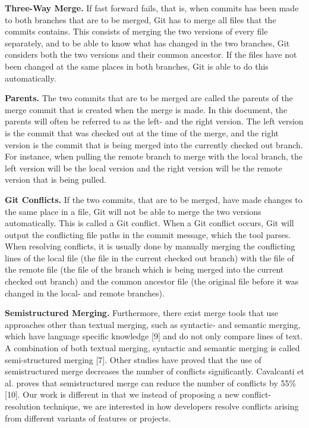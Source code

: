 \textbf{Three-Way Merge.} If fast forward fails, that is, when commits has been made to both branches that are to be merged, Git has to merge all files that the commits contains. This consists of merging the two versions of every file separately, and to be able to know what has changed in the two branches, Git considers both the two versions and their common ancestor. If the files have not been changed at the same places in both branches, Git is able to do this automatically.

\textbf{Parents.} The two commits that are to be merged are called the parents of the merge commit that is created when the merge is made. In this document, the parents will often be referred to as the left- and the right version. The left version is the commit that was checked out at the time of the merge, and the right version is the commit that is being merged into the currently checked out branch. For instance, when pulling the remote branch to merge with the local branch, the left version will be the local version and the right version will be the remote version that is being pulled.

\textbf{Git Conflicts.} If the two commits, that are to be merged, have made changes to the same place in a file, Git will not be able to merge the two versions automatically. This is called a Git conflict. When a Git conflict occurs, Git will output the conflicting file paths in the commit message, which the tool parses. When resolving conflicts, it is usually done by manually merging the conflicting lines of the local file (the file in the current checked out branch) with the file of the remote file (the file of the branch which is being merged into the current checked out branch) and the common ancestor file (the original file before it was changed in the local- and remote branches).

\textbf{Semistructured Merging.} Furthermore, there exist merge tools that use approaches other than textual merging, such as syntactic- and semantic merging, which have language specific knowledge [9] and do not only compare lines of text. A combination of both textual merging, syntactic and semantic merging is called semi-structured merging [7]. Other studies have proved that the use of semistructured merge decreases the number of conflicts significantly. Cavalcanti et al. proves that semistructured merge can reduce the number of conflicts by 55\% [10]. Our work is different in that we instead of proposing a new conflict-resolution technique, we are interested in how developers resolve conflicts arising from different variants of features or projects.

